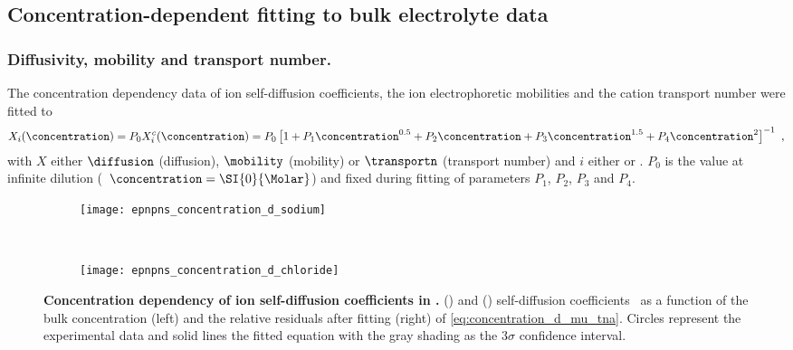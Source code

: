 %
\subsection{Concentration-dependent fitting to bulk electrolyte data}
%

\subsubsection{Diffusivity, mobility and transport number.}
%
The  concentration dependency data of ion self-diffusion coefficients, the ion electrophoretic
mobilities and the cation transport number were fitted to
%
\begin{align}\label{eq:concentration_d_mu_tna}
  X_{i} (\concentration) = P_0 X_{i}^c (\concentration) =
  P_0 \left[ 1
           + P_1 \concentration^{0.5}
           + P_2 \concentration
           + P_3 \concentration^{1.5}
           + P_4 \concentration^2 
      \right]^{-1}
  \text{ ,}
\end{align}
%
with $X$ either $\diffusion$ (diffusion), $\mobility$ (mobility) or $\transportn$ (transport number) and $i$
either \Na{} or \Cl{}. $P_0$ is the value at infinite dilution (\ie~$\concentration = \SI{0}{\Molar}$) and
fixed during fitting of parameters $P_1$, $P_2$, $P_3$ and $P_4$.

%
\begin{figure*}[!b]
  \centering

  \begin{subfigure}[t]{11cm}
    \centering
    \caption{}\vspace{-1mm}\label{fig:epnpns_concentration_d_sodium}
    \texttt{[image: epnpns\_concentration\_d\_sodium]}
  \end{subfigure}
  \\
  \begin{subfigure}[t]{11cm}
    \centering
    \caption{}\vspace{-1mm}\label{fig:epnpns_concentration_d_chloride}
    \texttt{[image: epnpns\_concentration\_d\_chloride]}
  \end{subfigure}

  \caption[Concentration depend. of ion self-diffusion coefficients in ]%
    {%
      \textbf{Concentration dependency of ion self-diffusion coefficients in .}
      ()
      \Na{} and
      ()
      \Cl{} self-diffusion coefficients~\cite{Mills-1989} as a function of the bulk  concentration
      (left) and the relative residuals after fitting (right) of \cref{eq:concentration_d_mu_tna}. Circles
      represent the experimental data and solid lines the fitted equation with the gray shading as the
      $3\sigma$ confidence interval.
  }\label{fig:epnpns_concentration_d}
\end{figure*}
%


